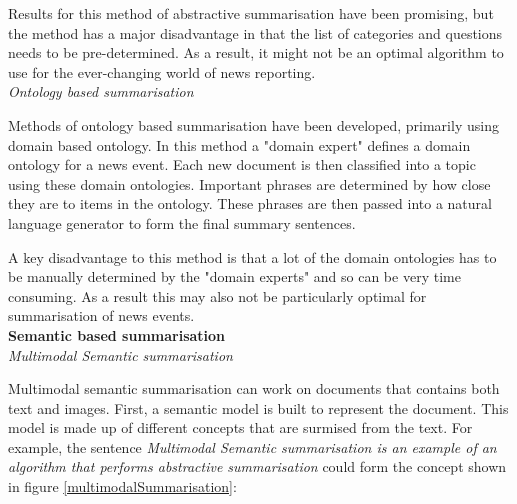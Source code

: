 \documentclass[12pt]{article}
\begin{document}
Results for this method of abstractive summarisation have been promising, but the method has a major disadvantage in that the list of categories and questions needs to be pre-determined. As a result, it might not be an optimal algorithm to use for the ever-changing world of news reporting. \\

\emph{Ontology based summarisation}

Methods of ontology based summarisation have been developed, primarily using domain based ontology. In this method a "domain expert" defines a domain ontology for a news event. Each new document is then classified into a topic using these domain ontologies. Important phrases are determined by how close they are to items in the ontology. These phrases are then passed into a natural language generator to form the final summary sentences.

A key disadvantage to this method is that a lot of the domain ontologies has to be manually determined by the "domain experts" and so can be very time consuming. As a result this may also not be particularly optimal for summarisation of news events. \\

\textbf{Semantic based summarisation} \\

\emph{Multimodal Semantic summarisation}

Multimodal semantic summarisation can work on documents that contains both text and images. First, a semantic model is built to represent the document. This model is made up of different concepts that are surmised from the text. For example, the sentence \emph{Multimodal Semantic summarisation is an example of an algorithm that performs abstractive summarisation} could form the concept shown in figure \ref{multimodalSummarisation}:
\end{document}
